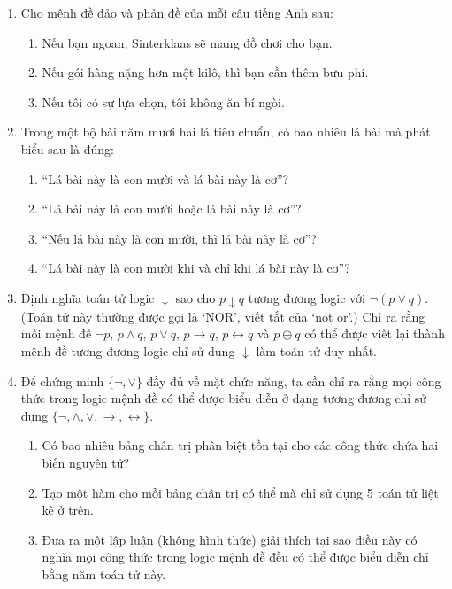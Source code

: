 \begin{enumerate}
\item[$\dagger$7.] Cho mệnh đề đảo và phản đề của mỗi câu tiếng Anh sau:
\begin{enumerate}[label=\alph*)]
\item Nếu bạn ngoan, Sinterklaas sẽ mang đồ chơi cho bạn.
\item Nếu gói hàng nặng hơn một kilô, thì bạn cần thêm bưu phí.
\item Nếu tôi có sự lựa chọn, tôi không ăn bí ngòi.
\end{enumerate}

\item[$\dagger$8.] Trong một bộ bài năm mươi hai lá tiêu chuẩn, có bao nhiêu lá bài mà phát biểu sau là đúng:
\begin{enumerate}[label=\alph*)]
\item ``Lá bài này là con mười và lá bài này là cơ''?
\item ``Lá bài này là con mười hoặc lá bài này là cơ''?
\item ``Nếu lá bài này là con mười, thì lá bài này là cơ''?
\item ``Lá bài này là con mười khi và chỉ khi lá bài này là cơ''?
\end{enumerate}

\item[$\dagger$9.] Định nghĩa toán tử logic $\downarrow$ sao cho $p \downarrow q$ tương đương logic với $\lnot(p \lor q)$. (Toán tử này thường được gọi là `NOR', viết tắt của `not or'.) Chỉ ra rằng mỗi mệnh đề $\lnot p$, $p \land q$, $p \lor q$, $p \to q$, $p \leftrightarrow q$ và $p \oplus q$ có thể được viết lại thành mệnh đề tương đương logic chỉ sử dụng $\downarrow$ làm toán tử duy nhất.

\item[$\dagger$10.] Để chứng minh $\{\lnot, \lor\}$ đầy đủ về mặt chức năng, ta cần chỉ ra rằng mọi công thức trong logic mệnh đề có thể được biểu diễn ở dạng tương đương chỉ sử dụng $\{\lnot, \land, \lor, \to, \leftrightarrow\}$.
\begin{enumerate}[label=\alph*)]
\item Có bao nhiêu bảng chân trị phân biệt tồn tại cho các công thức chứa hai biến nguyên tử?
\item Tạo một hàm cho mỗi bảng chân trị có thể mà chỉ sử dụng 5 toán tử liệt kê ở trên.
\item Đưa ra một lập luận (không hình thức) giải thích tại sao điều này có nghĩa mọi công thức trong logic mệnh đề đều có thể được biểu diễn chỉ bằng năm toán tử này.
\end{enumerate}
\end{enumerate}

